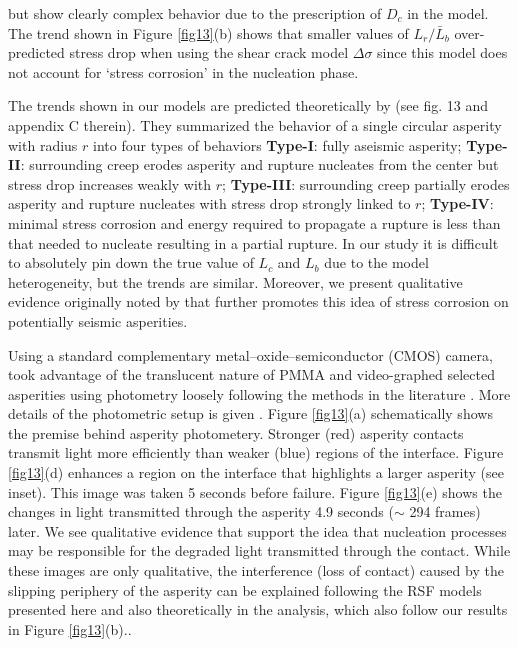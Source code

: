 \documentclass[draft]{agujournal2019}
\begin{document}
but show clearly complex behavior due to the prescription of $D_{c}$ in the model.  The trend shown in Figure \ref{fig13}(b) shows that smaller values of $L_{r}/\bar{L}_{b}$ over-predicted stress drop when using the shear crack model $\Delta\sigma$ since this model does not account for `stress corrosion' in the nucleation phase.

The trends shown in our models are predicted theoretically by  (see fig. 13 and appendix C therein).  They summarized the behavior of a single circular asperity with radius $r$ into four types of behaviors \textbf{Type-I}: fully aseismic asperity; \textbf{Type-II}: surrounding creep erodes asperity and rupture nucleates from the center but stress drop increases weakly with $r$; \textbf{Type-III}: surrounding creep partially erodes asperity and rupture nucleates with stress drop strongly linked to $r$; \textbf{Type-IV}: minimal stress corrosion and energy required to propagate a rupture is less than that needed to nucleate resulting in a partial rupture. In our study it is difficult to absolutely pin down the true value of $L_{c}$ and $L_{b}$ due to the model heterogeneity, but the trends are similar. Moreover, we present qualitative evidence originally noted by  that further promotes this idea of stress corrosion on potentially seismic asperities.  

Using a standard complementary metal–oxide–semiconductor (CMOS) camera,  took advantage of the translucent nature of PMMA and video-graphed selected asperities using photometry loosely following the methods in the literature \cite{Dieterich1994a, Dieterich1996}.  More details of the photometric setup is given \cite{Selvadurai2015a}. Figure \ref{fig13}(a) schematically shows the premise behind asperity photometery.  Stronger (red) asperity contacts transmit light more efficiently than weaker (blue) regions of the interface. Figure \ref{fig13}(d) enhances a region on the interface that highlights a larger asperity (see inset).  This image was taken 5 seconds before failure.  Figure \ref{fig13}(e) shows the changes in light transmitted through the asperity 4.9 seconds ($\sim$ 294 frames) later.  We see qualitative evidence that support the idea that nucleation processes may be responsible for the degraded light transmitted through the contact. While these images are only qualitative, the interference (loss of contact) caused by the slipping periphery of the asperity can be explained following the RSF models presented here and also theoretically in the  analysis, which also follow our results in Figure \ref{fig13}(b).. 
\end{document}
